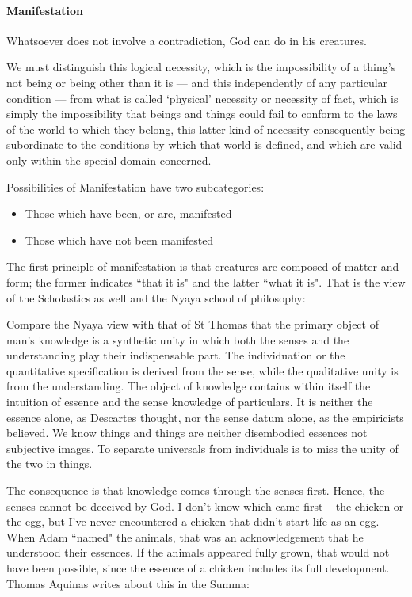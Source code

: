 \paragraph{Manifestation}
\begin{quotex}
Whatsoever does not involve a contradiction, God can do in his creatures. 

We must distinguish this logical necessity, which is the impossibility of a thing's not being or being other than it is — and this independently of any particular condition — from what is called `physical' necessity or necessity of fact, which is simply the impossibility that beings and things could fail to conform to the laws of the world to which they belong, this latter kind of necessity consequently being subordinate to the conditions by which that world is defined, and which are valid only within the special domain concerned. 

\end{quotex}
Possibilities of Manifestation have two subcategories:

\begin{itemize}
\item Those which have been, or are, manifested 
\item Those which have not been manifested 
\end{itemize}
The first principle of manifestation is that creatures are composed of matter and form; the former indicates ``that it is" and the latter ``what it is". That is the view of the Scholastics as well and the Nyaya school of philosophy:

\begin{quotex}
Compare the Nyaya view with that of St Thomas that the primary object of man's knowledge is a synthetic unity in which both the senses and the understanding play their indispensable part. The individuation or the quantitative specification is derived from the sense, while the qualitative unity is from the understanding. The object of knowledge contains within itself the intuition of essence and the sense knowledge of particulars. It is neither the essence alone, as Descartes thought, nor the sense datum alone, as the empiricists believed. We know things and things are neither disembodied essences not subjective images. To separate universals from individuals is to miss the unity of the two in things. 

\end{quotex}
The consequence is that knowledge comes through the senses first. Hence, the senses cannot be deceived by God. I don't know which came first – the chicken or the egg, but I've never encountered a chicken that didn't start life as an egg. When Adam ``named" the animals, that was an acknowledgement that he understood their essences. If the animals appeared fully grown, that would not have been possible, since the essence of a chicken includes its full development. Thomas Aquinas writes about this in the Summa:

